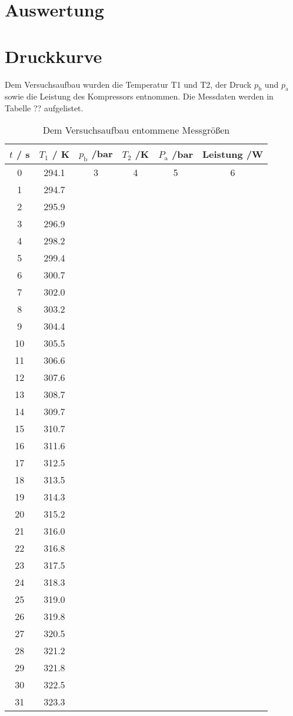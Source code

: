 \section{Auswertung}
\label{sec:Auswertung}
\section{Druckkurve}
Dem Versuchsaufbau wurden die Temperatur T1 und T2, der Druck $p_{\text{b}}$ und $p_{\text{a}}$ sowie die Leistung des Kompressors entnommen. Die Messdaten werden in Tabelle ?? aufgelistet.
\begin{table}
  \centering
  \begin{tabular}{c c c c c c}
    \toprule
    $t$ / s & $T_{\text{1}}$ / K & $p_{\text{b}}$ /bar & $T_{2}$ /K & $P_{\text{a}}$ /bar & 
    Leistung /W \\
    \midrule
    0 	& 294.1 & 3	&4 &5&6 \\
    1 	& 294.7 &	&	\\
    2 	& 295.9 &	&	\\
    3 	& 296.9 &	&	\\
    4	& 298.2	&	&	\\
    5	& 299.4 &	&	\\
    6	& 300.7 &	&	\\
    7	& 302.0 &	&	\\
    8	& 303.2	&	&	\\
    9	& 304.4 &	&	\\
    10	& 305.5 &	&	\\
    11 	& 306.6 &	&	\\
    12	& 307.6	&	&	\\	
    13	& 308.7 &	&	\\	
    14 	& 309.7 &	&	\\
    15 	& 310.7 &	&	\\
    16 	& 311.6	&	&	\\
    17	& 312.5	&	&	\\
    18	& 313.5	&	&	\\
    19	& 314.3	&	&	\\
    20	& 315.2	&	&	\\
    21	& 316.0	&	&	\\
    22	& 316.8	&	&	\\
    23	& 317.5	&	&	\\
    24	& 318.3	&	&	\\
    25	& 319.0	&	&	\\
    26	& 319.8	&	&	\\
    27	& 320.5	&	&	\\
    28	& 321.2	&	&	\\
    29	& 321.8	&	&	\\
    30	& 322.5	&	&	\\
    31	& 323.3	&	&	\\
  \end{tabular}
  \caption{Dem Versuchsaufbau entommene Messgrößen}
  \label{tab:Daten}
\end{table}

